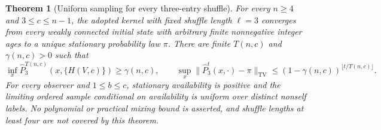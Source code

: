 \documentclass[11pt]{article}
\newtheorem{theorem}{Theorem}
\newcommand{\TV}{\mathrm{TV}}
\begin{document}
\begin{theorem}[Uniform sampling for every three-entry shuffle]
\label{thm:threegeneraluniform}
For every $n\ge4$ and $3\le c\le n-1$, the adopted kernel
with fixed shuffle length $\ell=3$ converges from every weakly
connected initial state with arbitrary finite nonnegative integer
ages to a unique stationary probability law $\pi$. There are
finite $T(n,c)$ and $\gamma(n,c)>0$ such that
\[
 \inf_x\widehat P_3^{T(n,c)}(x,\{H(V,c)\})\ge\gamma(n,c),\qquad
 \sup_x\|\widehat P_3^t(x,\cdot)-\pi\|_{\TV}
 \le(1-\gamma(n,c))^{\lfloor t/T(n,c)\rfloor}.
\]
For every observer and $1\le b\le c$, stationary availability
is positive and the limiting ordered sample conditional on
availability is uniform over distinct nonself labels. No
polynomial or practical mixing bound is asserted, and shuffle
lengths at least four are not covered by this theorem.
\end{theorem}
\end{document}
